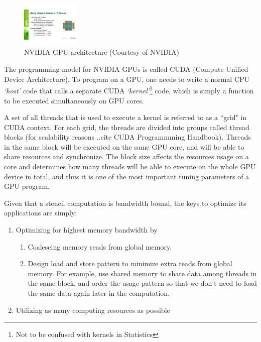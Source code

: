 \begin{figure}[!t]
\centering
\includegraphics[width=0.25\textwidth]{./images/gpu-architecture.pdf}
\caption{NVIDIA GPU architecture (Courtesy of NVIDIA)}
\label{fig:gpu-arch}
\end{figure}

The programming model for NVIDIA GPUs is called CUDA (Compute Unified Device Architecture). To program on a GPU, one needs to write a normal CPU \emph{`host'} code that calls a separate CUDA \emph{`kernel'}\footnote{Not to be confused with kernels in Statistics} code, which is simply a function to be executed simultaneously on GPU cores.

A set of all threads that is used to execute a kernel is referred to as a ``grid" in CUDA context. For each grid, the threads are divided into groups called thread blocks (for scalability reasons ..cite CUDA Programmming Handbook). Threads in the same block will be executed on the same GPU core, and will be able to share resources and synchronize. The block size affects the resources usage on a core and determines how many threads will be able to execute on the whole GPU device in total, and thus it is one of the most important tuning parameters of a GPU program.

Given that a stencil computation is bandwidth bound, the keys to optimize its applications are simply:
\begin{enumerate}
	\item Optimizing for highest memory bandwidth by
		\begin{enumerate}
			\item Coalescing memory reads from global memory.
			\item Design load and store pattern to minimize extra reads from global memory. For example, use shared memory to share data among threads in the same block, and order the usage pattern so that we don't need to load the same data again later in the computation.
		\end{enumerate}
	\item Utilizing as many computing resources as possible
\end{enumerate}

